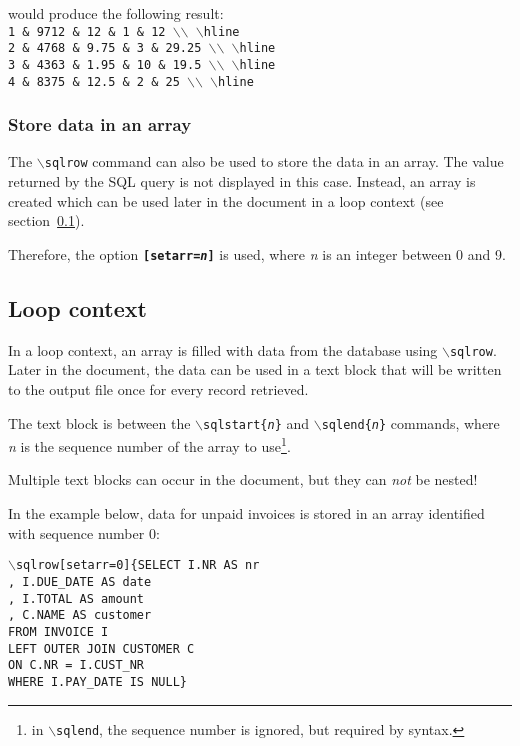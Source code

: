 \documentclass{article}
\newcommand{\bs}{\ensuremath{\backslash}}
\newcommand{\vs}{\vspace{3mm}}
\begin{document}
\vs

would produce the following result: \\
\texttt{1 \& 9712 \& 12 \& 1 \& 12 \bs\bs~\bs hline \\
2 \& 4768 \& 9.75 \& 3 \& 29.25 \bs\bs~\bs hline \\
3 \& 4363 \& 1.95 \& 10 \& 19.5 \bs\bs~\bs hline \\
4 \& 8375 \& 12.5 \& 2 \& 25 \bs\bs~\bs hline}



\subsubsection{Store data in an array}


The \texttt{\bs sqlrow} command can also be used to store the data in an array. The value returned by the SQL query is not displayed in this case. Instead, an array is created which can be used later in the document in a loop context (see section~\ref{loops}).

Therefore, the option \texttt{\textbf{[setarr=\textit{n}]}} is used, where \textit{n} is an integer between
0 and 9.

\subsection{Loop context}\label{loops}

In a loop context, an array is filled with data from the database using \texttt{\bs sqlrow}.\\
Later in the document, the data can be used in a text block that will be written to the output file once for every record retrieved.

\vs

The text block is between the \texttt{\bs sqlstart\{\textit{n}\}} and \texttt{\bs sqlend\{\textit{n}\}} commands, where \textit{n} is the sequence number of the array to use\footnote{ in \texttt{\bs sqlend}, the sequence number is ignored, but required by syntax.}.

Multiple text blocks can occur in the document, but they can \textit{not} be nested!

\vs

In the example below, data for unpaid invoices is stored in an array identified with sequence number 0:
 
\texttt{\bs sqlrow[setarr=0]\{SELECT I.NR AS nr\\
\hspace*{15mm},  I.DUE\_DATE AS date\\
\hspace*{15mm},  I.TOTAL AS amount\\
\hspace*{15mm},  C.NAME AS customer\\
\hspace*{15mm}FROM INVOICE I\\
\hspace*{15mm}LEFT OUTER JOIN CUSTOMER C\\
\hspace*{20mm}ON C.NR = I.CUST\_NR\\
\hspace*{15mm}WHERE I.PAY\_DATE IS NULL\}}
\end{document}
